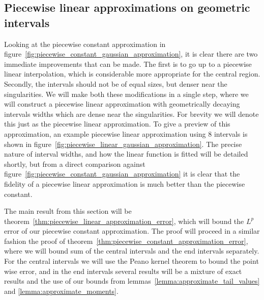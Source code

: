 \documentclass[manuscript,review]{acmart}
\begin{document}
\subsection{Piecewise linear approximations on geometric intervals}
\label{sec:piecewise_linear_approximations_on_geometric_intervals}

Looking at the piecewise constant approximation in figure~\ref{fig:piecewise_constant_gaussian_approximation}, it is clear there are two immediate improvements that can be made. The first is to go up to a piecewise linear interpolation, which is considerable more appropriate for the central region. Secondly, the intervals should not be of equal sizes, but denser near the singularities. We will make both these modifications in a single step, where we will construct a piecewise linear approximation with geometrically decaying intervals widths which are dense near the singularities. For brevity we will denote this just as the piecewise linear approximation. To give a preview of this approximation, an example piecewise linear approximation using 8 intervals is shown in figure~\ref{fig:piecewise_linear_gaussian_approximation}. The precise nature of interval widths, and how the linear function is fitted will be detailed shortly, but from a direct comparison against figure~\ref{fig:piecewise_constant_gaussian_approximation} it is clear that the fidelity of a piecewise linear approximation is much better than the piecewise constant. 

The main result from this section will be theorem~\ref{thm:piecewise_linear_approximation_error}, which will bound the $ L^p $ error of our piecewise constant approximation. The proof will proceed in a similar fashion the proof of theorem~\ref{thm:piecewise_constant_approximation_error}, where we will bound sum of the central intervals and the end intervals separately. For the central intervals we will use the Peano kernel theorem to bound the point wise error, and in the end intervals several results will be a mixture of exact results and the use of our bounds from lemmas~\ref{lemma:approximate_tail_values} and \ref{lemma:approximate_moments}.
\end{document}
